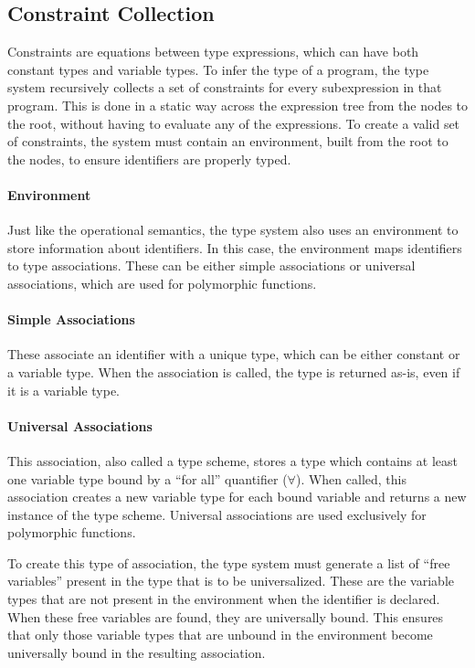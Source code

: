 \documentclass{article}
\begin{document}
\subsection{Constraint Collection}

Constraints are equations between type expressions, which can have both constant types and variable types.
To infer the type of a program, the type system recursively collects a set of constraints for every subexpression in that program.
This is done in a static way across the expression tree from the nodes to the root, without having to evaluate any of the expressions.
To create a valid set of constraints, the system must contain an environment, built from the root to the nodes, to ensure identifiers are properly typed.

\paragraph{Environment}
Just like the operational semantics, the type system also uses an environment to store information about identifiers.
In this case, the environment maps identifiers to type associations.
These can be either simple associations or universal associations, which are used for polymorphic functions.

\paragraph{Simple Associations}
These associate an identifier with a unique type, which can be either constant or a variable type.
When the association is called, the type is returned as-is, even if it is a variable type.

\paragraph{Universal Associations}
This association, also called a type scheme, stores a type which contains at least one variable type bound by a ``for all'' quantifier ($\forall$).
When called, this association creates a new variable type for each bound variable and returns a new instance of the type scheme.
Universal associations are used exclusively for polymorphic functions.

To create this type of association, the type system must generate a list of ``free variables'' present in the type that is to be universalized.
These are the variable types that are not present in the environment when the identifier is declared.
When these free variables are found, they are universally bound.
This ensures that only those variable types that are unbound in the environment become universally bound in the resulting association.
\end{document}
